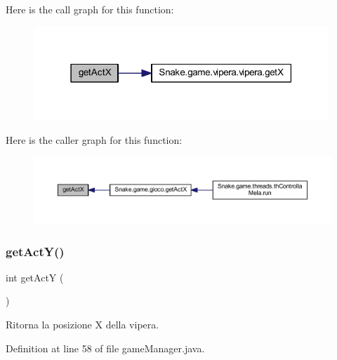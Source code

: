 Here is the call graph for this function\+:
\nopagebreak
\begin{figure}[H]
\begin{center}
\leavevmode
\includegraphics[width=315pt]{class_snake_1_1game_1_1utility_1_1game_manager_ae853a40673c27fff3315c5213c749814_cgraph}
\end{center}
\end{figure}
Here is the caller graph for this function\+:
\nopagebreak
\begin{figure}[H]
\begin{center}
\leavevmode
\includegraphics[width=350pt]{class_snake_1_1game_1_1utility_1_1game_manager_ae853a40673c27fff3315c5213c749814_icgraph}
\end{center}
\end{figure}
\mbox{\label{class_snake_1_1game_1_1utility_1_1game_manager_ae336e912feaec4a5e82fca472bde7f8f}} 
\subsubsection{\texorpdfstring{get\+Act\+Y()}{getActY()}}
{\footnotesize\ttfamily int get\+ActY (\begin{DoxyParamCaption}{ }\end{DoxyParamCaption})}



Ritorna la posizione X della vipera. 



Definition at line 58 of file game\+Manager.\+java.

